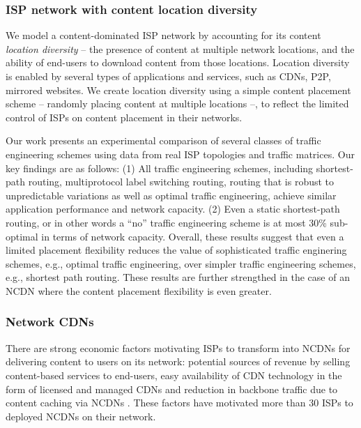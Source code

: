 \subsubsection{ISP network with content location diversity}

We model a content-dominated ISP network by accounting for its content \emph{location diversity} -- the presence of content at multiple network locations, and the ability of end-users to download content from those locations. Location diversity is enabled by several types of applications and services, such as CDNs, P2P, mirrored websites. We create location diversity using a simple content placement scheme -- randomly placing content at multiple locations --, to reflect the limited control of ISPs on content placement in their networks. 


Our work presents an experimental comparison of several classes of traffic engineering schemes using data from real ISP topologies and traffic matrices. Our key findings are as follows: (1) All traffic engineering schemes, including shortest-path routing, multiprotocol label switching routing, routing that is robust to unpredictable variations as well as optimal traffic engineering, achieve similar application performance and network capacity.   (2) Even a static shortest-path routing, or in other words a ``no'' traffic engineering  scheme is at most 30\% sub-optimal in terms of network capacity. Overall, these results suggest that even a limited placement flexibility reduces the value of sophisticated traffic enginering schemes, e.g., optimal traffic engineering, over simpler traffic engineering schemes, e.g., shortest path routing. These results are further strengthed in the case of an NCDN where the content placement flexibility is even greater.


\subsubsection{Network CDNs}

There are strong economic factors motivating ISPs to transform into NCDNs for delivering content to users on its network: %
potential sources of revenue by selling content-based services to end-users, easy availability of CDN technology in the form of licensed and managed CDNs and reduction in backbone traffic due to content caching via NCDNs \cite{telco-cdn-arguments}. These factors have motivated more than 30 ISPs to deployed NCDNs on their network.

